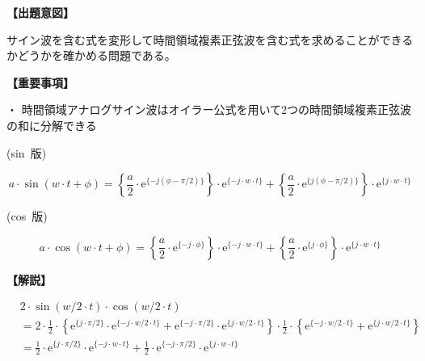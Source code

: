 \noindent \textbf{【出題意図】}

\bigskip
\noindent サイン波を含む式を変形して時間領域複素正弦波を含む式を求めることができるかどうかを確かめる問題である。

\vspace{1em}
\noindent \textbf{【重要事項】}

\medskip
\noindent ・ 時間領域アナログサイン波はオイラー公式を用いて2つの時間領域複素正弦波の和に分解できる

\medskip
\noindent \mbox{(sin 版)}

\[
a \cdot \sin ( w \cdot t + \phi )
=  \left \{ \frac{a}{2} \cdot \textrm{e}^{\{-j (\phi-\pi/2) \}} \right \} \cdot \textrm{e}^{\{-j \cdot w \cdot t \}}
+  \left \{ \frac{a}{2} \cdot \textrm{e}^{\{j (\phi-\pi/2) \}} \right \} \cdot \textrm{e}^{\{j \cdot w \cdot t \}}
\]

\medskip
\noindent \mbox{(cos 版)}

\[
a \cdot \cos ( w \cdot t + \phi )
=  \left \{ \frac{a}{2} \cdot \textrm{e}^{\{-j \cdot \phi \}} \right \} \cdot \textrm{e}^{\{-j \cdot w \cdot t \}}
+  \left \{ \frac{a}{2} \cdot \textrm{e}^{\{j  \cdot \phi \}} \right \} \cdot \textrm{e}^{\{j \cdot w \cdot t \}}
\]

\bigskip

\vspace{1em}
\noindent \textbf{【解説】}

\bigskip

\begin{align*}
& 2 \cdot \sin(w/2 \cdot t) \cdot \cos( w/2 \cdot t) \\
& = 
2 \cdot
\frac{1}{2}\cdot\left \{
  \textrm{e}^{\{ j \cdot \pi/2 \}} \cdot \textrm{e}^{\{-j \cdot w/2 \cdot t \}} 
+ \textrm{e}^{\{-j \cdot \pi/2 \}} \cdot \textrm{e}^{\{ j \cdot w/2 \cdot t \}} 
\right \}
\cdot
\frac{1}{2}\cdot\left \{
  \textrm{e}^{\{-j \cdot w/2 \cdot t \}} 
+ \textrm{e}^{\{ j \cdot w/2 \cdot t \}} 
\right \} \\
& =
  \frac{1}{2} \cdot \textrm{e}^{\{ j \cdot \pi/2 \}} \cdot \textrm{e}^{\{-j \cdot w \cdot t \}}
+ \frac{1}{2} \cdot \textrm{e}^{\{-j \cdot \pi/2 \}} \cdot \textrm{e}^{\{ j \cdot w \cdot t \}}
\end{align*}
